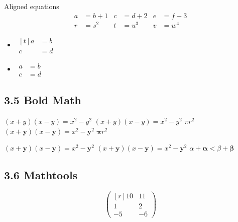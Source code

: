 \documentclass[a4paper]{article}
\begin{document}
 Aligned equations
 \begin{align*}
 a &= b+1 & c &= d+2 & e &= f+3 \\
 r &= s^{2} & t &=u^{3} & v &= w^{4}
 \end{align*}


 \begin{itemize}
 \item
 $\begin{aligned}[t]
 a&=b\\
 c&=d
 \end{aligned}$
 \item
 $\begin{aligned}
 a&=b\\
 c&=d
 \end{aligned}$
 \end{itemize}

\subsection*{}
\subsection*{ 3.5 Bold Math}

 $(x+y)(x-y)=x^{2}-y^{2}$
 {\boldmath $(x+y)(x-y)=x^{2}-y^{2}$ $\pi r^2$}
 $(x+\mathbf{y})(x-\mathbf{y})=x^{2}-{\mathbf{y}}^{2}$
 $\mathbf{\pi} r^2$ %



$(x+\mathbf{y})(x-\mathbf{y})=x^{2}-{\mathbf{y}}^{2}$
 $(x+\bm{y})(x-\bm{y}) \bm{=} x^{2}-{\bm{y}}^{2}$
 $\alpha + \bm{\alpha} < \beta + \bm{\beta}$


\subsection*{ 3.6 Mathtools}

 \[
 \begin{pmatrix*}[r]
 10&11\\
 1&2\\-5&-6
 \end{pmatrix*}
 \]
\end{document}

